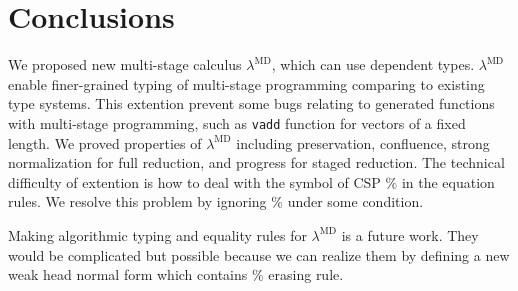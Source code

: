 \documentclass[runningheads]{llncs}
\newcommand{\LMD}{$\lambda^{\textrm{MD}}$\xspace}
\begin{document}
  \section{Conclusions}

  We proposed new multi-stage calculus \LMD, which can use dependent types.
  \LMD enable finer-grained typing of multi-stage programming comparing to existing type systems.
  This extention prevent some bugs relating to generated functions with multi-stage programming,
  such as \verb|vadd| function for vectors of a fixed length.
  We proved properties of \LMD including preservation, confluence, 
  strong normalization for full reduction, and progress for staged reduction.
  The technical difficulty of extention is how to deal with the symbol of CSP $\%$ in the equation rules.
  We resolve this problem by ignoring $\%$ under some condition.

  Making algorithmic typing and equality rules for \LMD is a future work.
  They would be complicated but possible 
  because we can realize them by defining a new weak head normal form which contains $\%$ erasing rule.
\end{document}
